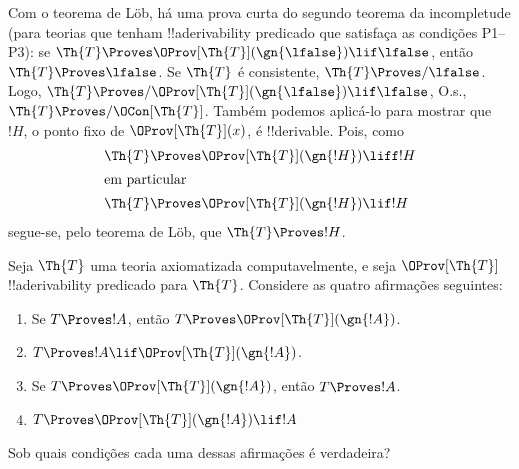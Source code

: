 \documentclass[../../../include/open-logic-section]{subfiles}
\begin{document}
Com o teorema de L\"ob, há uma prova curta do segundo teorema da
incompletude (para teorias que tenham !!a{derivability} predicado que
satisfaça as condições P1--P3): se $\Th{T} \Proves
\OProv[\Th{T}](\gn{\lfalse}) \lif \lfalse$, então
$\Th{T} \Proves \lfalse$. Se $\Th{T}$ é consistente,
$\Th{T} \Proves/ \lfalse$. Logo,
$\Th{T} \Proves/ \OProv[\Th{T}](\gn{\lfalse}) \lif \lfalse$, O.s.\@,
$\Th{T} \Proves/ \OCon[\Th{T}]$. Também podemos aplicá-lo para mostrar que
~$!H$, o ponto fixo de $\OProv[\Th{T}](x)$, é !!{derivable}. Pois, como
\begin{align*}
  \Th{T} & \Proves \OProv[\Th{T}](\gn{!H}) \liff !H\\
  \intertext{em particular}
    \Th{T} & \Proves \OProv[\Th{T}](\gn{!H}) \lif !H
\end{align*}
segue-se, pelo teorema de L\"ob, que $\Th{T} \Proves !H$.


\begin{prob}
Seja $\Th{T}$ uma teoria axiomatizada computavelmente, e seja
$\OProv[\Th{T}]$ !!a{derivability} predicado para $\Th{T}$. Considere as
quatro afirmações seguintes:
\begin{enumerate}
\item Se $T \Proves !A$, então $T \Proves \OProv[\Th{T}](\gn{!A})$.
\item $T \Proves !A \lif \OProv[\Th{T}](\gn{!A})$.
\item Se $T \Proves \OProv[\Th{T}](\gn{!A})$, então $T \Proves !A$.
\item $T \Proves \OProv[\Th{T}](\gn{!A}) \lif !A$
\end{enumerate}
Sob quais condições cada uma dessas afirmações é verdadeira?
\end{prob}
\end{document}
